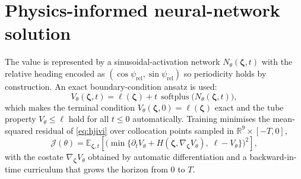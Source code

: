 \documentclass[11pt]{article}
\newcommand{\R}{\mathbb{R}}
\newcommand{\zvec}{\boldsymbol{\zeta}}
\begin{document}
\section{Physics-informed neural-network solution}
The value is represented by a sinusoidal-activation network
$N_\theta(\zvec,t)$ with the relative heading encoded as $(\cos\psi_{\mathrm{rel}},
\sin\psi_{\mathrm{rel}})$ so periodicity holds by construction. An exact
boundary-condition ansatz is used:
\begin{equation}
V_\theta(\zvec,t)=\ell(\zvec)+t\,\operatorname{softplus}\!\big(N_\theta(\zvec,t)\big),
\end{equation}
which makes the terminal condition $V_\theta(\zvec,0)=\ell(\zvec)$ exact and the
tube property $V_\theta\le\ell$ hold for all $t\le0$ automatically. Training
minimises the mean-squared residual of \eqref{eq:hjivi} over collocation points
sampled in $\R^9\times[-T,0]$,
\begin{equation}
\mathcal{J}(\theta)=\mathbb{E}_{\zvec,t}\!\left[\Big(
\min\{\partial_t V_\theta+H(\zvec,\nabla_{\zvec}V_\theta),\;\ell-V_\theta\}\Big)^2\right],
\end{equation}
with the costate $\nabla_{\zvec}V_\theta$ obtained by automatic differentiation and a
backward-in-time curriculum that grows the horizon from $0$ to $T$.

\end{document}
